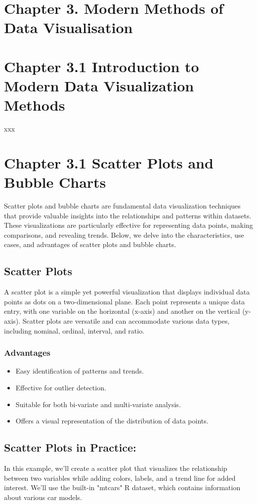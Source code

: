 \documentclass{article}\usepackage[]{graphicx}\usepackage[]{xcolor}
\begin{document}
\section{Chapter 3. Modern Methods of Data Visualisation}

\section{Chapter 3.1 Introduction to Modern Data Visualization Methods}
xxx

\section{Chapter 3.1 Scatter Plots and Bubble Charts}
Scatter plots and bubble charts are fundamental data visualization techniques that provide valuable insights into the relationships and patterns within datasets. These visualizations are particularly effective for representing data points, making comparisons, and revealing trends. Below, we delve into the characteristics, use cases, and advantages of scatter plots and bubble charts.

\subsection{Scatter Plots}
A scatter plot is a simple yet powerful visualization that displays individual data points as dots on a two-dimensional plane. Each point represents a unique data entry, with one variable on the horizontal (x-axis) and another on the vertical (y-axis). Scatter plots are versatile and can accommodate various data types, including nominal, ordinal, interval, and ratio.

\subsubsection{Advantages}
\begin{itemize}
    \item Easy identification of patterns and trends. 
    \item Effective for outlier detection. 
    \item Suitable for both bi-variate and multi-variate analysis.
    \item Offers a visual representation of the distribution of data points.
\end{itemize}

\subsection{Scatter Plots in Practice:}
In this example, we'll create a scatter plot that visualizes the relationship between two variables while adding colors, labels, and a trend line for added interest. We'll use the built-in "mtcars" R dataset, which contains information about various car models.
\end{document}
